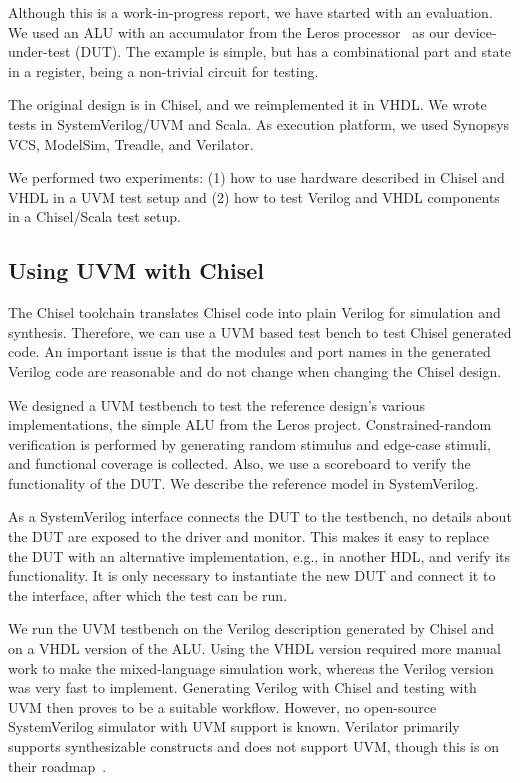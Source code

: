 \documentclass[conference]{IEEEtran}
\newcommand{\martin}[1]{{\color{blue} Martin: #1}}
\renewcommand{\martin}[1]{}
\begin{document}
Although this is a work-in-progress report, we have started with an evaluation.
We used an ALU with an accumulator from the Leros processor~\cite{leros:arcs2019}
as our device-under-test (DUT).
The example is simple, but has a combinational part and state in a register, being
a non-trivial circuit for testing.

The original design is in Chisel, and we reimplemented it in VHDL.
We wrote tests in SystemVerilog/UVM and Scala.
As execution platform, we used Synopsys VCS, ModelSim, Treadle, and Verilator.

We performed two experiments: (1) how to use hardware described in Chisel and VHDL in a
UVM test setup and (2) how to test Verilog and VHDL components in a Chisel/Scala
test setup.

\martin{We should have implementations in all languages we consider.}


\subsection{Using UVM with Chisel}

The Chisel toolchain translates Chisel code into plain Verilog for simulation and synthesis. Therefore, we can use a UVM based test bench to test Chisel generated code.
An important issue is that the modules and port names in the generated Verilog code are reasonable and do not change when changing the Chisel design.

We designed a UVM testbench to test the reference design's various implementations, the simple ALU from the Leros project.
Constrained-random verification is performed by generating random stimulus and edge-case stimuli, and functional coverage is collected. Also, we use a scoreboard to verify the functionality of the DUT. We describe the reference model in SystemVerilog.

As a SystemVerilog interface connects the DUT to the testbench, no details about the DUT are exposed to the driver and monitor. This makes it easy to replace the DUT with an alternative implementation, e.g., in another HDL, and verify its functionality. It is only necessary to instantiate the new DUT and connect it to the interface, after which the test can be run.

We run the UVM testbench on the Verilog description generated by Chisel and on a VHDL version of the ALU. Using the VHDL version required more manual work to make the mixed-language simulation work, whereas the Verilog version was very fast to implement. Generating Verilog with Chisel and testing with UVM then proves to be a suitable workflow. However, no open-source SystemVerilog simulator with UVM support is known.
Verilator primarily supports synthesizable constructs and does not support UVM, though this is on their roadmap~\cite{Snyder2019}.
\end{document}
